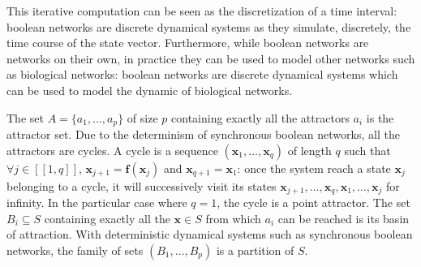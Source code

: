 \documentclass[oneside,a4paper,onecolumn,notitlepage]{article}
\begin{document}
This iterative computation can be seen as the discretization of a time interval: boolean networks are discrete dynamical systems as they simulate, discretely, the time course of the state vector. Furthermore, while boolean networks are networks on their own, in practice they can be used to model other networks such as biological networks: boolean networks are discrete dynamical systems which can be used to model the dynamic of biological networks.

The set $A=\lbrace a_1,\dots,a_p\rbrace$ of size $p$ containing exactly all the attractors $a_i$ is the attractor set. Due to the determinism of synchronous boolean networks, all the attractors are cycles. A cycle is a sequence $(\boldsymbol{x}_{1},\dots,\boldsymbol{x}_{q})$ of length $q$ such that $\forall j\in [\![1,q]\!]$, $\boldsymbol{x}_{j+1}=\boldsymbol{f}(\boldsymbol{x}_{j})$ and $\boldsymbol{x}_{q+1}=\boldsymbol{x}_{1}$: once the system reach a state $\boldsymbol{x}_{j}$ belonging to a cycle, it will successively visit its states $\boldsymbol{x}_{j+1},\dots,\boldsymbol{x}_{q},\boldsymbol{x}_{1},\dots,\boldsymbol{x}_{j}$ for infinity. In the particular case where $q=1$, the cycle is a point attractor. The set $B_i\subseteq S$ containing exactly all the $\boldsymbol{x}\in S$ from which $a_i$ can be reached is its basin of attraction. With deterministic dynamical systems such as synchronous boolean networks, the family of sets $(B_1,\dots,B_p)$ is a partition of $S$.
\end{document}

